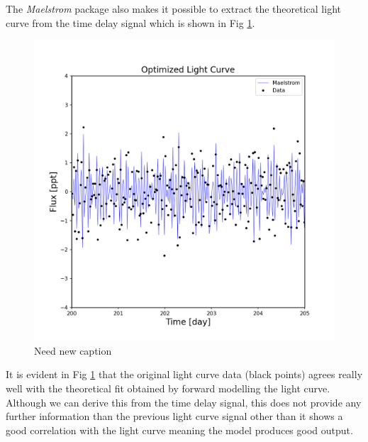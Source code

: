 \documentclass[]{article}
\begin{document}
The \textit{Maelstrom} package also makes it possible to extract the theoretical light curve from the time delay signal which is shown in Fig \ref{fig:LightcurveOptimized}.
\begin{figure}[H]
    \centering
    \includegraphics[width=1\linewidth]{lightcurve_opt.png}
      \caption{Need new caption}
      \label{fig:LightcurveOptimized}
\end{figure}

It is evident in Fig \ref{fig:LightcurveOptimized} that the original light curve data (black points) agrees really well with the theoretical fit obtained by forward modelling the light curve.
Although we can derive this from the time delay signal, this does not provide any further information than the previous light curve signal other than it shows a good correlation with the light curve meaning the model produces good output.
\end{document}
